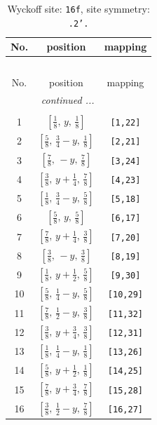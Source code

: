 \documentclass[fleqn,8pt]{jsarticle}
\begin{document}
\renewcommand{\arraystretch}{1.2}
\begin{longtable}{ccc}
\caption{Wyckoff site: {\tt 16f}, site symmetry: {\tt .2'.}}
 \\
 \hline \hline
No. & position & mapping \\ \hline \endfirsthead

\multicolumn{2}{l}{\tablename\ \thetable{}} \\
 \hline \hline
No. & position & mapping \\ \hline \endhead

 \hline \hline
\multicolumn{2}{r}{\footnotesize\it continued ...} \\ \endfoot

 \hline \hline
\multicolumn{2}{r}{} \\ \endlastfoot

1 & $\left[ \frac{1}{8},\, y,\, \frac{1}{8} \right]$ & {\tt [1,22]} \\ \hline
2 & $\left[ \frac{5}{8},\, \frac{3}{4} - y,\, \frac{1}{8} \right]$ & {\tt [2,21]} \\ \hline
3 & $\left[ \frac{7}{8},\, - y,\, \frac{7}{8} \right]$ & {\tt [3,24]} \\ \hline
4 & $\left[ \frac{3}{8},\, y + \frac{1}{4},\, \frac{7}{8} \right]$ & {\tt [4,23]} \\ \hline
5 & $\left[ \frac{1}{8},\, \frac{3}{4} - y,\, \frac{5}{8} \right]$ & {\tt [5,18]} \\ \hline
6 & $\left[ \frac{5}{8},\, y,\, \frac{5}{8} \right]$ & {\tt [6,17]} \\ \hline
7 & $\left[ \frac{7}{8},\, y + \frac{1}{4},\, \frac{3}{8} \right]$ & {\tt [7,20]} \\ \hline
8 & $\left[ \frac{3}{8},\, - y,\, \frac{3}{8} \right]$ & {\tt [8,19]} \\ \hline
9 & $\left[ \frac{1}{8},\, y + \frac{1}{2},\, \frac{5}{8} \right]$ & {\tt [9,30]} \\ \hline
10 & $\left[ \frac{5}{8},\, \frac{1}{4} - y,\, \frac{5}{8} \right]$ & {\tt [10,29]} \\ \hline
11 & $\left[ \frac{7}{8},\, \frac{1}{2} - y,\, \frac{3}{8} \right]$ & {\tt [11,32]} \\ \hline
12 & $\left[ \frac{3}{8},\, y + \frac{3}{4},\, \frac{3}{8} \right]$ & {\tt [12,31]} \\ \hline
13 & $\left[ \frac{1}{8},\, \frac{1}{4} - y,\, \frac{1}{8} \right]$ & {\tt [13,26]} \\ \hline
14 & $\left[ \frac{5}{8},\, y + \frac{1}{2},\, \frac{1}{8} \right]$ & {\tt [14,25]} \\ \hline
15 & $\left[ \frac{7}{8},\, y + \frac{3}{4},\, \frac{7}{8} \right]$ & {\tt [15,28]} \\ \hline
16 & $\left[ \frac{3}{8},\, \frac{1}{2} - y,\, \frac{7}{8} \right]$ & {\tt [16,27]} \\
\end{longtable}
\end{document}
